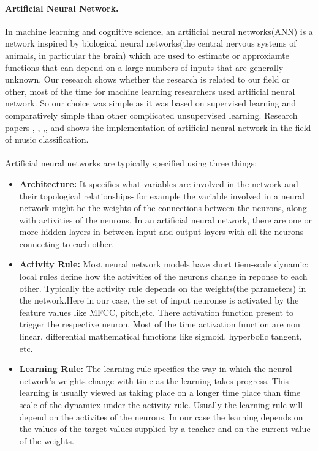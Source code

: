 {\paragraph{Artificial Neural Network.}
In machine learning and cognitive science, an artificial neural networks(ANN) is a network inspired by biological neural networks(the central nervous systems of 
animals, in particular the brain) which are used to estimate or approxiamte functions that can depend on a large numbers of inputs that are generally unknown.
Our research shows whether the research is related to our field or other, most of the time for machine learning researchers used artificial neural network.
So our choice was simple as it was based on supervised learning and comparatively simple than other complicated unsupervised learning.
Research papers \cite{Koerich2013}, \cite{Neumayer2004}, ,\cite{Anglade2010}, \cite{Haggblade2011} and \cite{Kour2015} shows the implementation of artificial neural network in the field of
music classification.\\
\\
Artificial neural networks are typically specified using three things:
\begin{itemize}
        \item \textbf{Architecture:} 
                It specifies what variables are involved in the network and their topological relationships- for example the variable involved
                in a neural network might be the weights of the connections between the neurons, along with activities of the neurons. In an artificial
                neural network, there are one or more hidden layers in between input and output layers with all the neurons connecting to each other.
        \item \textbf{Activity Rule:}
                Most neural network models have short tiem-scale dynamic: local rules define how the activities of the neurons change in reponse to each other.
                Typically the activity rule depends on the weights(the parameters) in the network.Here in our case, the set of input neuronse
                is activated by the feature values like MFCC, pitch,etc. There activation function present to trigger the respective neuron. Most of the time
                activation function are non linear, differential mathematical functions like sigmoid, hyperbolic tangent, etc.
        \item \textbf{Learning Rule:}
                The learning rule specifies the way in which the neural network's weights change with time as the learning takes progress. This learning is usually viewed as 
                taking place on a longer time place than time scale of the dynamicx under the activity rule. Usually the learning rule will depend on the activites of the 
                neurons. In our case the learning depends on the values of the target values supplied by a teacher and on the current value of the weights.
\end{itemize}

}
